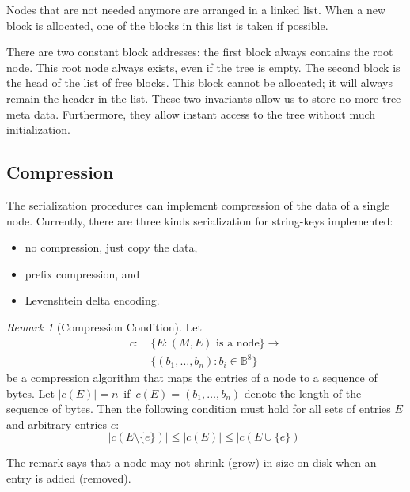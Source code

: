 \documentclass[a4paper, 9pt]{scrartcl}
\theoremstyle{plain}
\theoremstyle{definition}
\theoremstyle{remark}
\newtheorem{rem}[thm]{Remark}
\begin{document}
\begin{multicols}{2}
Nodes that are not needed anymore are arranged in a linked list. When a
new block is allocated, one of the blocks in this list is taken if possible.

There are two constant block addresses: the first block always contains the
root node. This root node always exists, even if the tree is empty.
The second block is the head of the list of free blocks. This block cannot
be allocated; it will always remain the header in the list.
These two invariants allow us to store no more tree meta data.
Furthermore, they allow instant access to the tree without much initialization.


\subsection{Compression}
The serialization procedures can implement compression of the data of a
single node.
Currently, there are three kinds serialization for string-keys implemented:
\begin{itemize}
\item no compression, just copy the data,
\item prefix compression, and
\item Levenshtein delta encoding.
\end{itemize}

\begin{rem}[Compression Condition]
Let
\begin{align*}
c: \ & \{ E : (M, E) \text{ is a node} \} \rightarrow\\
     & \{ (b_1, \ldots, b_n) : b_i \in \mathbb{B}^8 \}
\end{align*}
be a compression algorithm that maps the entries of a node to a sequence of
bytes. Let \mbox{$|c(E)| = n$ if $c(E) = (b_1, \ldots, b_n)$} denote the length of
the sequence of bytes.
Then the following condition must hold for all sets of entries $E$ and arbitrary
entries $e$:
\[ |c(E \setminus \{e\})| \leq |c(E)| \leq |c(E \cup \{e\})| \]
\end{rem}

The remark says that a node may not shrink (grow) in size on disk when
an entry is added (removed).




\end{multicols}
\end{document}

